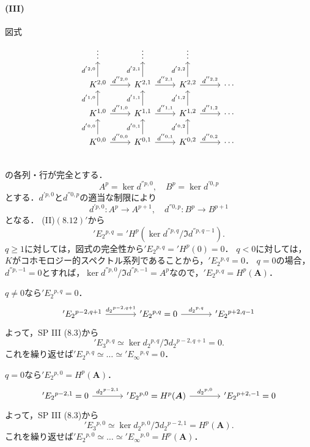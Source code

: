 \paragraph{(III)}
図式
\[
\begin{tikzcd}
  \vdots & \vdots & \vdots \\
  K^{2, 0} \arrow[u, "d^{'2, 0}"]\arrow[r, "d^{''2, 0}"] & K^{2, 1} \arrow[u, "d^{'2, 1}"]\arrow[r, "d^{''2, 1}"] & K^{2, 2} \arrow[u, "d^{'2, 2}"]\arrow[r, "d^{''2, 2}"] & \cdots \\
  K^{1, 0} \arrow[u, "d^{'1, 0}"]\arrow[r, "d^{''1, 0}"] & K^{1, 1} \arrow[u, "d^{'1, 1}"]\arrow[r, "d^{''1, 1}"] & K^{1, 2} \arrow[u, "d^{'1, 2}"]\arrow[r, "d^{''1, 2}"] & \cdots \\
  K^{0, 0} \arrow[u, "d^{'0, 0}"]\arrow[r, "d^{''0, 0}"] & K^{0, 1} \arrow[u, "d^{'0, 1}"]\arrow[r, "d^{''0, 1}"] & K^{0, 2} \arrow[u, "d^{'0, 2}"]\arrow[r, "d^{''0, 2}"] & \cdots \\
\end{tikzcd}
\]
の各列・行が完全とする．
\[ A^p = \ker d^{''p, 0} , \quad B^p = \ker d^{'0, p} \]
とする．\(d^{'p, 0}\)と\(d^{''0, p}\)の適当な制限により
\[ d^{'p, 0} \colon A^p \to A^{p+1} , \quad d^{''0, p} \colon B^p \to B^{p+1} \]
となる．
(II)\((8.12)'\)から
\[ 'E_2{}^{p, q} = {}'H^p(\ker d^{''p,q} / \Im d^{''p, q-1}) . \]
\(q\geq1\)に対しては，図式の完全性から\('E_2{}^{p, q} = {}'H^p(0) = 0\)．
\(q<0\)に対しては，\(K\)がコホモロジー的スペクトル系列であることから，\('E_2{}^{p, q} = 0\)．
\(q=0\)の場合，\(d^{''p, -1} = 0\)とすれば，\(\ker d^{''p, 0} / \Im d^{''p, -1} = A^p\)なので，\('E_2{}^{p, q} = H^p(\boldsymbol{A})\)．

\(q\neq0\)なら\('E_2{}^{p, q} = 0\)．
\[
\begin{tikzcd}[column sep = large]
  'E_2{}^{p-2, q+1} \arrow[r, "d_2{}^{p-2, q+1}"] & 'E_2{}^{p, q} = 0 \arrow[r, "d_2{}^{p, q}"] & 'E_2{}^{p+2, q-1}
\end{tikzcd}
\]
よって，SP III (8.3)から
\[ 'E_3{}^{p, q} \simeq \ker d_2{}^{p, q} / \Im d_2{}^{p-2, q+1} = 0 . \]
これを繰り返せば\('E_2{}^{p, q} \simeq \dots \simeq {}'E_\infty{}^{p, q} = 0\)．

\(q=0\)なら\('E_2{}^{p, 0} = H^p(\boldsymbol{A})\)．
\[
\begin{tikzcd}[column sep = large]
  'E_2{}^{p-2, 1} = 0 \arrow[r, "d_2{}^{p-2, 1}"] & 'E_2{}^{p, 0} = H^p(\boldsymbol{A}) \arrow[r, "d_2{}^{p, 0}"] & 'E_2{}^{p+2, -1} = 0
\end{tikzcd}
\]
よって，SP III (8.3)から
\[ 'E_3{}^{p, 0} \simeq \ker d_2{}^{p, 0} / \Im d_2{}^{p-2, 1} = H^p(\boldsymbol{A}) . \]
これを繰り返せば\('E_2{}^{p, 0} \simeq \dots \simeq {}'E_\infty{}^{p, 0} = H^p(\boldsymbol{A})\)．

